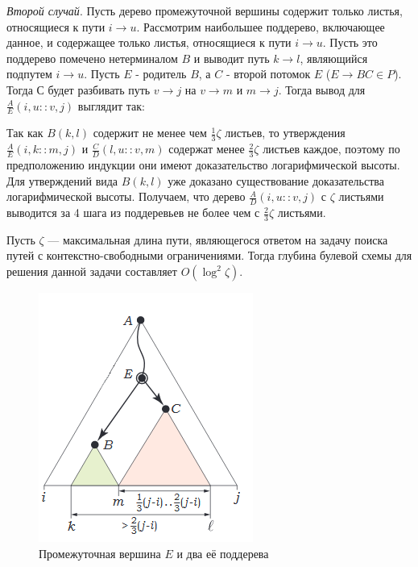 \documentclass{spbau-diploma}
\begin{document}
\textit{Второй случай}. Пусть  дерево промежуточной вершины содержит только листья, относящиеся к пути $i \rightarrow u$. Рассмотрим наибольшее поддерево, включающее данное, и содержащее только листья, относящиеся к пути $i \rightarrow u$. Пусть это поддерево помечено нетерминалом $B$ и выводит путь $k \rightarrow l$, являющийся подпутем $i \rightarrow u$. Пусть $E$ - родитель $B$, а $C$ - второй потомок $E$ ($E \rightarrow BC \in P$). Тогда $С$ будет разбивать путь $v \rightarrow j$ на  $v \rightarrow m$ и  $m \rightarrow j$. Тогда вывод для $\frac{A}{E}(i , u :: v , j)$ выглядит так:
\begin{prooftree}

\end{prooftree}
Так как $B(k, l)$ содержит не менее чем  $\frac{1}{3}\zeta$ листьев, то утверждения $\frac{A}{E}(i , k :: m , j)$ и $\frac{C}{D}(l , u :: v , m)$ содержат менее  $\frac{2}{3}\zeta$ листьев каждое, поэтому по предположению индукции они имеют доказательство логарифмической высоты. Для утверждений вида $B(k, l)$ уже доказано существование доказательства логарифмической высоты. Получаем, что дерево $\frac{A}{D}(i , u :: v , j)$ с $\zeta$ листьями выводится за 4 шага из поддеревьев не более чем с  $\frac{2}{3}\zeta$ листьями.
\begin{lemmarus}\label{Depthzeta}
Пусть $\zeta$ --- максимальная длина пути, являющегося ответом на задачу поиска путей с контекстно-свободными ограничениями. Тогда глубина булевой схемы для решения данной задачи составляет $O(\log^2 \zeta)$. 
\end{lemmarus}
\begin{figure}[!]
\centering
\includegraphics[scale=0.94]{e.png}
\caption{Промежуточная вершина $E$ и два её поддерева}
\label{e}
\end{figure}
\end{document}
